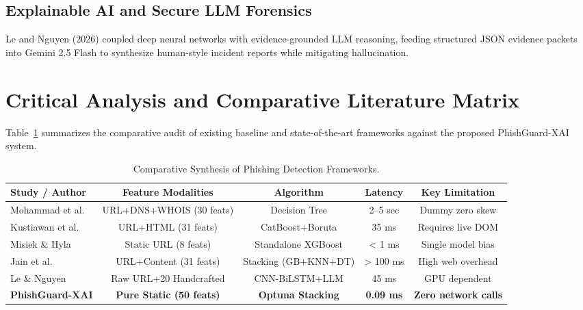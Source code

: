 \documentclass[12pt,a4paper,oneside]{report}
\begin{document}
\subsection{Explainable AI and Secure LLM Forensics}
Le and Nguyen (2026) \cite{lenguyen2026} coupled deep neural networks with evidence-grounded LLM reasoning, feeding structured JSON evidence packets into Gemini 2.5 Flash to synthesize human-style incident reports while mitigating hallucination.

\section{Critical Analysis and Comparative Literature Matrix}
Table~\ref{tab:lit_survey_matrix} summarizes the comparative audit of existing baseline and state-of-the-art frameworks against the proposed PhishGuard-XAI system.

\begin{table}[h]
\centering
\caption{Comparative Synthesis of Phishing Detection Frameworks.}
\label{tab:lit_survey_matrix}
\small
\begin{tabular}{lcccc}
\toprule
\textbf{Study / Author} & \textbf{Feature Modalities} & \textbf{Algorithm} & \textbf{Latency} & \textbf{Key Limitation} \\
\midrule
Mohammad et al. \cite{mohammad2014} & URL+DNS+WHOIS (30 feats) & Decision Tree & 2--5 sec & Dummy zero skew \\
Kustiawan et al. \cite{kustiawan2025} & URL+HTML (31 feats) & CatBoost+Boruta & 35 ms & Requires live DOM \\
Misiek \& Hyla \cite{misiek2026} & Static URL (8 feats) & Standalone XGBoost & < 1 ms & Single model bias \\
Jain et al. \cite{jain2026} & URL+Content (31 feats) & Stacking (GB+KNN+DT) & > 100 ms & High web overhead \\
Le \& Nguyen \cite{lenguyen2026} & Raw URL+20 Handcrafted & CNN-BiLSTM+LLM & 45 ms & GPU dependent \\
\textbf{PhishGuard-XAI} & \textbf{Pure Static (50 feats)} & \textbf{Optuna Stacking} & \textbf{0.09 ms} & \textbf{Zero network calls} \\
\bottomrule
\end{tabular}
\end{table}

\end{document}
